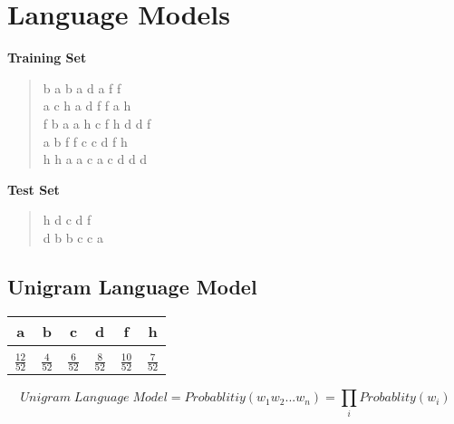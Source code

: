 \documentclass{article}
\begin{document}
\section{Language Models} 
\textbf{Training Set}
\begin{quote}
	b a b a d a f f 	\\
	a c h a d f f a h 	\\ 
	f b a a h c f h d d f 	\\
	a b f f c c d f h 	\\
	h h a a c a c d d d 	\\
\end{quote}
\textbf{Test Set}
\begin{quote}
	h d c d f \\
	d b b c c a \\
\end{quote}
\subsection{Unigram Language Model}
\begin{center}
\begin{tabular}{c c c c c c} 
\hline\hline
a&b&c&d&f&h \\
\hline\hline
\\
	\(\frac{12}{52}\)&\(\frac{4}{52}\)&\(\frac{6}{52}\)&\(\frac{8}{52}\)&\(\frac{10}{52}\)&\(\frac{7}{52}\) \\ [2ex]
\hline
\end{tabular}
\end{center}
\begin{equation}
	Unigram\;Language\;Model = Probablitiy(w_1w_2...w_n) = \underset{i}{\prod} Probablity(w_i)
\end{equation}
\end{document}
